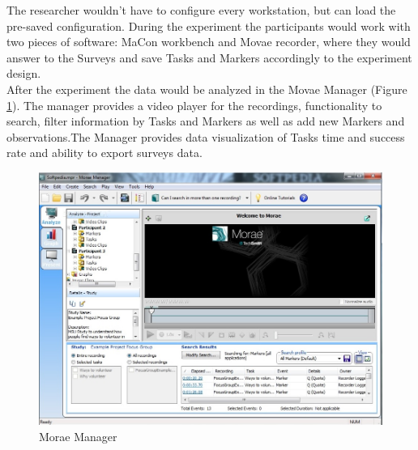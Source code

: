  The researcher wouldn't have to configure every workstation, but can load the pre-saved configuration. During the experiment the participants would work with two pieces of software: MaCon workbench and Movae recorder, where they would answer to the Surveys and save Tasks and Markers accordingly to the experiment design.\\
 
 After the experiment the data would be analyzed in the Movae Manager (Figure \ref{fig:movae_manager}). The manager provides a video player for the recordings, functionality to search, filter information by Tasks and Markers as well as add new Markers and observations.The Manager provides data visualization of Tasks time and success rate and ability to export surveys data. \\
 
      \begin{figure}[htb]
 \centering
\includegraphics[width=\textwidth]{figures/morae_manager.jpg}
\caption{Morae Manager}
\label{fig:movae_manager}
 \end{figure}
 
